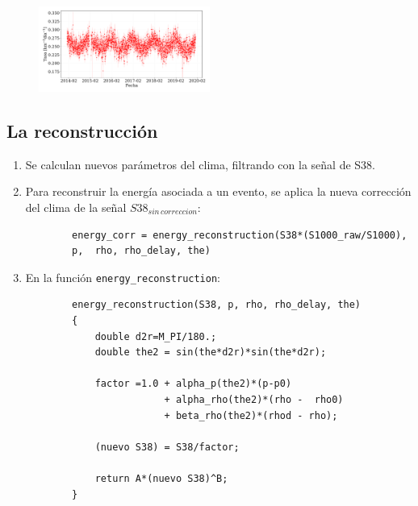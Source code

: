 \begin{figure}[H]
    \begin{small}
        \begin{center}
            \includegraphics[width=0.5\textwidth]{tasa_eventos_sin_corregir.pdf}
        \end{center}
        \caption{}
        \label{fig:nocorregido}
    \end{small}
\end{figure}

\subsection{La reconstrucción}



\begin{enumerate}
    \item Se calculan nuevos parámetros del clima, filtrando con la señal de S38.
    \item Para reconstruir la energía  asociada a un evento, se aplica la nueva corrección del clima de la señal $S38_{sin\,correccion}$:
    \begin{verbatim}
        energy_corr = energy_reconstruction(S38*(S1000_raw/S1000), 
        p,  rho, rho_delay, the) 
    \end{verbatim}
    \item En la función \verb|energy_reconstruction|:
    \begin{verbatim}
        energy_reconstruction(S38, p, rho, rho_delay, the)
        {
            double d2r=M_PI/180.;
            double the2 = sin(the*d2r)*sin(the*d2r);

            factor =1.0 + alpha_p(the2)*(p-p0) 
                        + alpha_rho(the2)*(rho -  rho0) 
                        + beta_rho(the2)*(rhod - rho); 

            (nuevo S38) = S38/factor;

            return A*(nuevo S38)^B;
        }
    \end{verbatim}
    

\end{enumerate}



